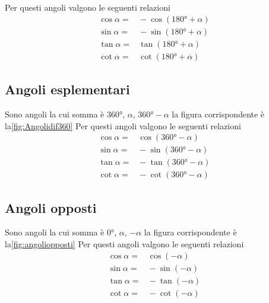 Per questi angoli valgono le seguenti relazioni
\begin{align*}
\cos\alpha=&{}-\cos(\ang{180}+\alpha)\\
\sin\alpha=&{}-\sin(\ang{180}+\alpha)\\
\tan\alpha=&{}\tan(\ang{180}+\alpha)\\
\cot\alpha=&{}\cot(\ang{180}+\alpha)
\end{align*}
\subsection{Angoli esplementari}
Sono angoli la cui somma è $\ang{360}$, $\alpha$, $\ang{360}-\alpha$ la figura corrispondente è la\nobs\vref{fig:Angolidif360}
Per questi angoli valgono le seguenti relazioni
\begin{align*}
\cos\alpha=&{}\cos(\ang{360}-\alpha)\\
\sin\alpha=&{}-\sin(\ang{360}-\alpha)\\
\tan\alpha=&{}-\tan(\ang{360}-\alpha)\\
\cot\alpha=&{}-\cot(\ang{360}-\alpha)
\end{align*}
\subsection{Angoli opposti}
Sono angoli la cui somma è $\ang{0}$, $\alpha$, $-\alpha$ la figura corrispondente è la\nobs\vref{fig:angoliopposti}
Per questi angoli valgono le seguenti relazioni
\begin{align*}
\cos\alpha=&{}\cos(-\alpha)\\
\sin\alpha=&{}-\sin(-\alpha)\\
\tan\alpha=&{}-\tan(-\alpha)\\
\cot\alpha=&{}-\cot(-\alpha)
\end{align*}
